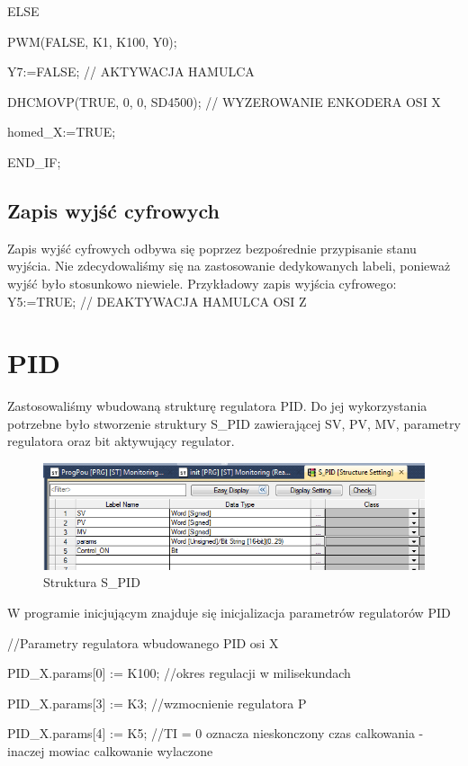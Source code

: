 \documentclass{mwrep}
\begin{document}
\quad ELSE

\quad PWM(FALSE, K1, K100, Y0);

\quad Y7:=FALSE; // AKTYWACJA HAMULCA

\quad DHCMOVP(TRUE, 0, 0, SD4500); // WYZEROWANIE ENKODERA OSI X

\quad homed\_X:=TRUE;

END\_IF;
 
\subsection{Zapis wyjść cyfrowych}
Zapis wyjść cyfrowych odbywa się poprzez bezpośrednie przypisanie stanu wyjścia. Nie zdecydowaliśmy się na zastosowanie dedykowanych labeli, ponieważ wyjść było stosunkowo niewiele.
	Przykładowy zapis wyjścia cyfrowego:
		Y5:=TRUE; // DEAKTYWACJA HAMULCA OSI Z


\section{PID}
\label{PLC::PID}

Zastosowaliśmy wbudowaną strukturę regulatora PID. Do jej wykorzystania potrzebne było stworzenie struktury S\_PID zawierającej SV, PV, MV, parametry regulatora oraz bit aktywujący regulator.

\begin{figure}[H]
    \label{PLC::Konfiguracja::HIOEN::WindowCH5}
    \centering
    \includegraphics[scale=0.5]{s_pid_struct.png}
    \caption{Struktura S\_PID}
\end{figure}


W programie inicjującym znajduje się inicjalizacja parametrów regulatorów PID 

\vspace{1cm}

//Parametry regulatora wbudowanego PID osi X

PID\_X.params[0] := K100; //okres regulacji w milisekundach

PID\_X.params[3] := K3; //wzmocnienie regulatora P

PID\_X.params[4] := K5; //TI = 0 oznacza nieskonczony czas calkowania - inaczej mowiac calkowanie wylaczone
\end{document}
